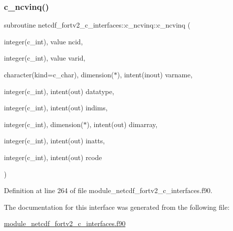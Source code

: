 \subsubsection{\texorpdfstring{c\+\_\+ncvinq()}{c\_ncvinq()}}
{\footnotesize\ttfamily subroutine netcdf\+\_\+fortv2\+\_\+c\+\_\+interfaces\+::c\+\_\+ncvinq\+::c\+\_\+ncvinq (\begin{DoxyParamCaption}\item[{integer(c\+\_\+int), value}]{ncid,  }\item[{integer(c\+\_\+int), value}]{varid,  }\item[{character(kind=c\+\_\+char), dimension($\ast$), intent(inout)}]{varname,  }\item[{integer(c\+\_\+int), intent(out)}]{datatype,  }\item[{integer(c\+\_\+int), intent(out)}]{indims,  }\item[{integer(c\+\_\+int), dimension($\ast$), intent(out)}]{dimarray,  }\item[{integer(c\+\_\+int), intent(out)}]{inatts,  }\item[{integer(c\+\_\+int), intent(out)}]{rcode }\end{DoxyParamCaption})}



Definition at line 264 of file module\+\_\+netcdf\+\_\+fortv2\+\_\+c\+\_\+interfaces.\+f90.



The documentation for this interface was generated from the following file\+:\begin{DoxyCompactItemize}
\item 
\hyperlink{module__netcdf__fortv2__c__interfaces_8f90}{module\+\_\+netcdf\+\_\+fortv2\+\_\+c\+\_\+interfaces.\+f90}\end{DoxyCompactItemize}
